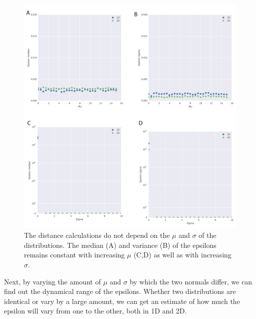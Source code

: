 \begin{figure}[htbp]
\centering
\includegraphics[scale=0.5]{chapterABCFlow/images/mus_sigmas_same.png}
\caption[LoF caption]{The distance calculations do not depend on the $\mu$ and $\sigma$ of the distributions. The median (A) and variance (B) of the epsilons remains constant with increasing $\mu$ (C,D) as well as with increasing $\sigma$. }
\label{fig:epsilon_mu_s_same}
\end{figure}
\clearpage
Next, by varying the amount of $\mu$ and $\sigma$ by which the two normals differ, we can find out the dynamical range of the epsilons. Whether two distributions are identical or vary by a large amount, we can get an estimate of how much the epsilon will vary from one to the other, both in 1D and 2D. 

